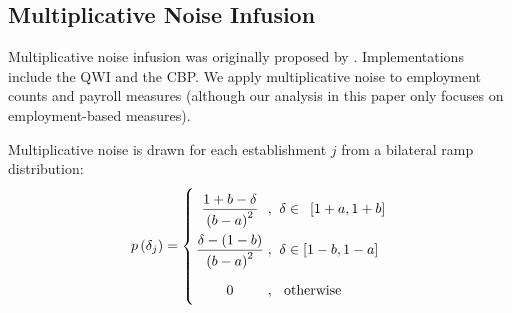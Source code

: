 \subsection{Multiplicative Noise Infusion}
Multiplicative noise infusion was originally proposed by \cite{EvansZayatzSlanta1998}. Implementations include the \ac{QWI} \cite{AbowdEtAl2009} and the \ac{CBP}. We apply multiplicative noise to employment counts and payroll measures (although our analysis in this paper only focuses on employment-based measures). 

Multiplicative noise is drawn  for each establishment $j$ 
from a bilateral ramp distribution:%
\begin{equation}\arraycolsep=1.4pt\def\arraystretch{2.2}
	p\left( {\delta _{j}}\right) =\left\{ {{%
			\begin{array}{ccl} 
			\dfrac{ {1+ b - \delta } }{\left( {b - a} \right)^2}
					&,&\;\delta \in \mbox{ }\left[ {1+a,1+b} \right] \\ 
				\dfrac{ {\delta - (1 - b)} }{\left( {b - a} \right)^2} 
				&,&\;\delta \in \left[ {1 - b,1 - a} \right] \\ 
				0&,&\;\mbox{ otherwise } \\
				 \end{array}%
		}}\right. 
	\end{equation}%
		
